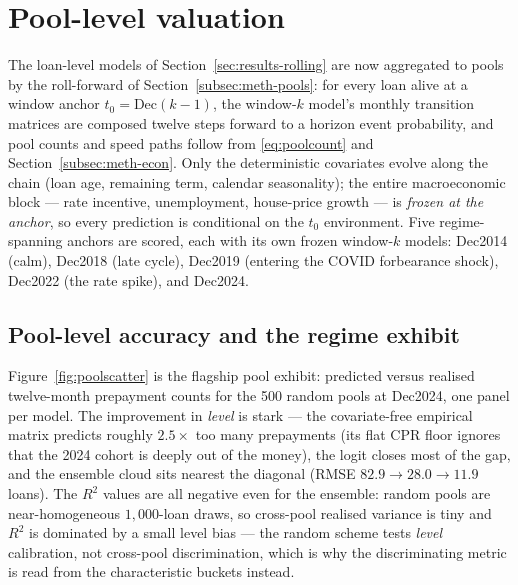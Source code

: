 
\chapter{Pool-level valuation}
\label{chap:poollevel}

The loan-level models of Section~\ref{sec:results-rolling} are now
aggregated to pools by the roll-forward of
Section~\ref{subsec:meth-pools}: for every loan alive at a window
anchor $t_0{=}\text{Dec}(k{-}1)$, the window-$k$ model's monthly
transition matrices are composed twelve steps forward to a horizon
event probability, and pool counts and speed paths follow from
\eqref{eq:poolcount} and Section~\ref{subsec:meth-econ}.  Only the
deterministic covariates evolve along the chain (loan age, remaining
term, calendar seasonality); the entire macroeconomic block --- rate
incentive, unemployment, house-price growth --- is \emph{frozen at the
anchor}, so every prediction is conditional on the $t_0$ environment.
Five regime-spanning anchors are scored, each with its own frozen
window-$k$ models: Dec2014 (calm), Dec2018 (late cycle), Dec2019
(entering the COVID forbearance shock), Dec2022 (the rate spike), and
Dec2024.

\section{Pool-level accuracy and the regime exhibit}

Figure~\ref{fig:poolscatter} is the flagship pool exhibit:
predicted versus realised twelve-month prepayment counts for the 500
random pools at Dec2024, one panel per model.  The improvement in
\emph{level} is stark --- the covariate-free empirical matrix predicts
roughly $2.5\times$ too many prepayments (its flat CPR floor ignores
that the 2024 cohort is deeply out of the money), the logit closes most
of the gap, and the ensemble cloud sits nearest the diagonal (RMSE
$82.9 \to 28.0 \to 11.9$ loans).  The $R^2$ values are all negative
even for the ensemble: random pools are near-homogeneous $1{,}000$-loan
draws, so cross-pool realised variance is tiny and $R^2$ is dominated
by a small level bias --- the random scheme tests \emph{level}
calibration, not cross-pool discrimination, which is why the
discriminating metric is read from the characteristic buckets instead.


